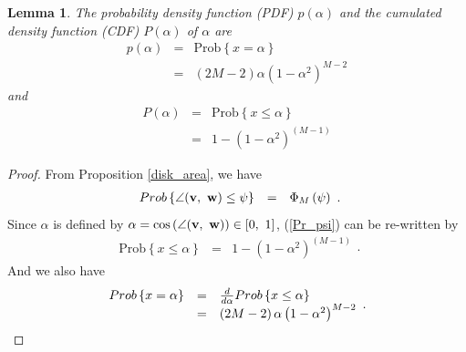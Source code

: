 \documentclass[a4paper,10pt,fleqn, twocolumn]{IEEEtran}
\newtheorem{lemma}{Lemma}
\newcommand{\bv}{{\bf v}}
\newcommand{\bw}{{\bf w}}
\begin{document}
\begin{lemma} The probability density function (PDF) $p\left(\alpha\right)$ and the cumulated density function (CDF) $P\left(\alpha\right)$ of
$\alpha$ are
\begin{equation}%
\begin{array}{rcl}
p\left(\alpha\right)&=&\mbox{Prob}\left\{x=\alpha\right\}\\
&=&\left(2M-2\right)\alpha\left(1-\alpha^2\right)^{M-2}
\end{array}
\end{equation}
\noindent and
\begin{equation}%
\begin{array}{rcl}
P\left(\alpha\right)&=&\mbox{Prob}\left\{x\leq\alpha\right\} \\
&=&1-\left(1-\alpha^2\right)^{(M-1)}
\end{array}
\end{equation}
\end{lemma}
\begin{proof}
From Proposition \ref{disk_area}, we have
\begin{equation}\label{Pr_psi}
\begin{array}{rcl}
\mbox{Prob}\left\{\angle(\bv,\
\bw)\leq\psi\right\}&=&\Phi_{M}\left(\psi\right)
\end{array}.
\end{equation}
\noindent Since $\alpha$ is defined by $\alpha =
\cos\left(\angle(\bv,\ \bw\right))\in\left[0,\ 1\right]$,
(\ref{Pr_psi}) can be re-written by
\begin{equation}\label{P_alpha}
\begin{array}{rcl}
\mbox{Prob}\left\{x\leq\alpha\right\}&=&1-\left(1-\alpha^2\right)^{(M-1)}
\end{array}.
\end{equation}
\noindent And we also have
\begin{equation}\hspace{-0.05in}
\begin{array}{rcl}
\mbox{Prob}\left\{x=\alpha\right\}&=&\frac{d}{d\alpha}\mbox{Prob}\left\{x\leq\alpha\right\}\\
&=&\left(2M-2\right)\alpha\left(1-\alpha^2\right)^{M-2}
\end{array}.\label{p_alpha}
\end{equation}

\end{proof}
\end{document}
